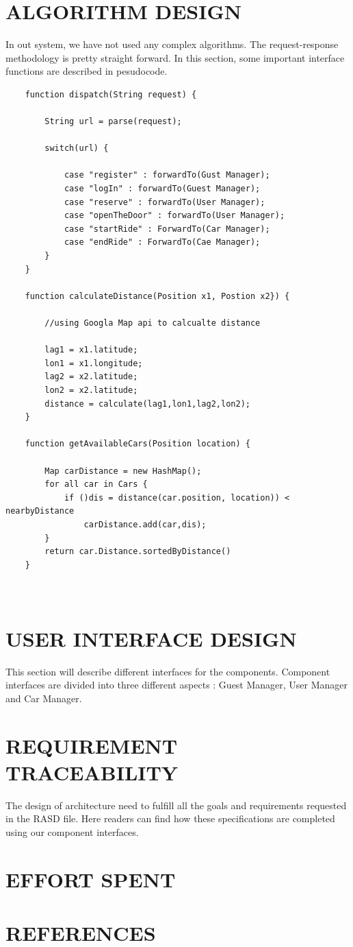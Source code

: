 \documentclass{article}
\begin{document}
	\section{ALGORITHM DESIGN}
	In out system, we have not used any complex algorithms. The request-response methodology is pretty straight forward. In this section, some important interface functions  are described in pesudocode.
	\begin{verbatim}
	function dispatch(String request) {
	
		String url = parse(request);
	
		switch(url) {
	
			case "register" : forwardTo(Gust Manager);	
			case "logIn" : forwardTo(Guest Manager);	
			case "reserve" : forwardTo(User Manager);	
			case "openTheDoor" : forwardTo(User Manager);	
			case "startRide" : ForwardTo(Car Manager);
			case "endRide" : ForwardTo(Cae Manager); 
		}
	}
	
	function calculateDistance(Position x1, Postion x2}) {
		
		//using Googla Map api to calcualte distance
		
		lag1 = x1.latitude;
		lon1 = x1.longitude;
		lag2 = x2.latitude;
		lon2 = x2.latitude;
		distance = calculate(lag1,lon1,lag2,lon2);
	}
	
	function getAvailableCars(Position location) {
		
		Map carDistance = new HashMap();
		for all car in Cars {
			if ()dis = distance(car.position, location)) < nearbyDistance 
				carDistance.add(car,dis);
		}
		return car.Distance.sortedByDistance()
	}
	
	
	\end{verbatim}
	\section{USER INTERFACE DESIGN}
	This section will describe different interfaces for the components. Component interfaces are divided into three different aspects : Guest Manager, User Manager and Car Manager.
	
	\newpage
	\section{REQUIREMENT TRACEABILITY}
	The design of architecture need to fulfill all the goals and requirements requested in the RASD file. Here readers can find how these specifications are completed using our component interfaces. 
	\newpage
	\section{EFFORT SPENT}
	\newpage
	\section{REFERENCES}
\end{document}

